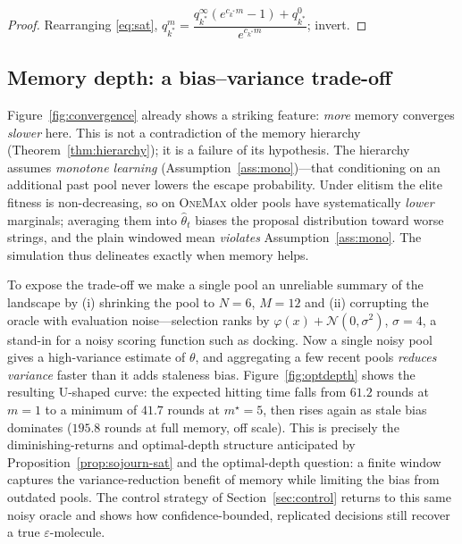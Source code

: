 \documentclass[11pt,a4paper]{article}
\begin{document}
\begin{proof}
  Rearranging \eqref{eq:sat},
  $q_{k^*}^m=\dfrac{q_{k^*}^\infty(e^{c_{k^*}m}-1)+q_{k^*}^0}{e^{c_{k^*}m}}$;
  invert.
\end{proof}

\subsection{Memory depth: a bias--variance trade-off}
\label{sec:num-memory}

Figure~\ref{fig:convergence} already shows a striking feature: \emph{more}
memory converges \emph{slower} here.  This is not a contradiction of the
memory hierarchy (Theorem~\ref{thm:hierarchy}); it is a failure of its
hypothesis.  The hierarchy assumes \emph{monotone learning}
(Assumption~\ref{ass:mono})---that conditioning on an additional past pool never
lowers the escape probability.  Under elitism the elite fitness is
non-decreasing, so on \textsc{OneMax} older pools have systematically
\emph{lower} marginals; averaging them into $\widehat\theta_t$ biases the
proposal distribution toward worse strings, and the plain windowed mean
\emph{violates} Assumption~\ref{ass:mono}.  The simulation thus delineates
exactly when memory helps.

To expose the trade-off we make a single pool an unreliable summary of
the landscape by (i) shrinking the pool to $N=6$, $M=12$ and (ii)
corrupting the oracle with evaluation noise---selection ranks by
$\varphi(x)+\mathcal{N}(0,\sigma^2)$, $\sigma=4$, a stand-in for a noisy
scoring function such as docking.  Now a single noisy pool gives a
high-variance estimate of $\theta$, and aggregating a few recent pools
\emph{reduces variance} faster than it adds staleness bias.
Figure~\ref{fig:optdepth} shows the resulting U-shaped curve: the expected
hitting time falls from $61.2$ rounds at $m=1$ to a minimum of $41.7$
rounds at $m^\star=5$, then rises again as stale bias dominates
($195.8$ rounds at full memory, off scale).  This is precisely the
diminishing-returns and optimal-depth structure anticipated by
Proposition~\ref{prop:sojourn-sat} and the optimal-depth question: a finite
window captures the variance-reduction benefit of memory while limiting
the bias from outdated pools.  The control strategy of
Section~\ref{sec:control} returns to this same noisy oracle and shows how
confidence-bounded, replicated decisions still recover a true
$\varepsilon$-molecule.
\end{document}
